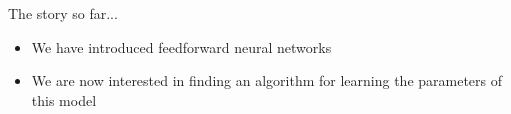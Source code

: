 \savestack{\nn}{}

\begin{frame}
\end{frame}

\begin{frame}
  \begin{block}{The story so far...}
    \begin{itemize}
      \item We have introduced feedforward neural networks
      \item We are now interested in finding an algorithm for learning the parameters of this model
    \end{itemize}
  \end{block}
\end{frame}


